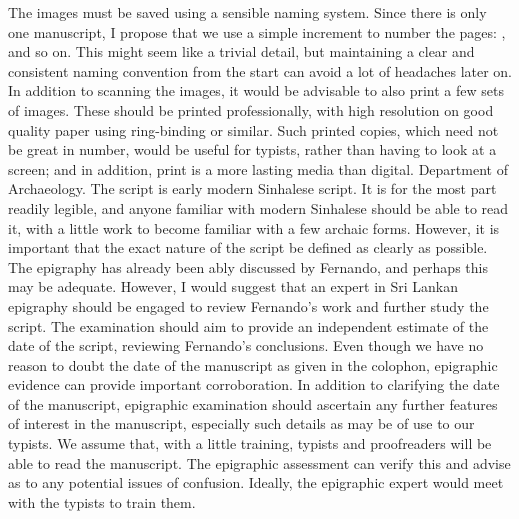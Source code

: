 {}The images must be saved using a sensible naming system. Since there is only one manuscript, I propose that we use a simple increment to number the pages: ,  and so on. This might seem like a trivial detail, but maintaining a clear and consistent naming convention from the start can avoid a lot of headaches later on.\markdownRendererInterblockSeparator
{}In addition to scanning the images, it would be advisable to also print a few sets of images. These should be printed professionally, with high resolution on good quality paper using ring-binding or similar. Such printed copies, which need not be great in number, would be useful for typists, rather than having to look at a screen; and in addition, print is a more lasting media than digital.\markdownRendererInterblockSeparator
{}\markdownRendererUlBeginTight
\markdownRendererUlItem {} Department of Archaeology.\markdownRendererUlItemEnd 
\markdownRendererUlEndTight \markdownRendererInterblockSeparator
{}\markdownRendererInterblockSeparator
{}The script is early modern Sinhalese script. It is for the most part readily legible, and anyone familiar with modern Sinhalese should be able to read it, with a little work to become familiar with a few archaic forms. However, it is important that the exact nature of the script be defined as clearly as possible. The epigraphy has already been ably discussed by Fernando, and perhaps this may be adequate. However, I would suggest that an expert in Sri Lankan epigraphy should be engaged to review Fernando’s work and further study the script.\markdownRendererInterblockSeparator
{}The examination should aim to provide an independent estimate of the date of the script, reviewing Fernando’s conclusions. Even though we have no reason to doubt the date of the manuscript as given in the colophon, epigraphic evidence can provide important corroboration.\markdownRendererInterblockSeparator
{}In addition to clarifying the date of the manuscript, epigraphic examination should ascertain any further features of interest in the manuscript, especially such details as may be of use to our typists. We assume that, with a little training, typists and proofreaders will be able to read the manuscript. The epigraphic assessment can verify this and advise as to any potential issues of confusion. Ideally, the epigraphic expert would meet with the typists to train them.\markdownRendererInterblockSeparator
